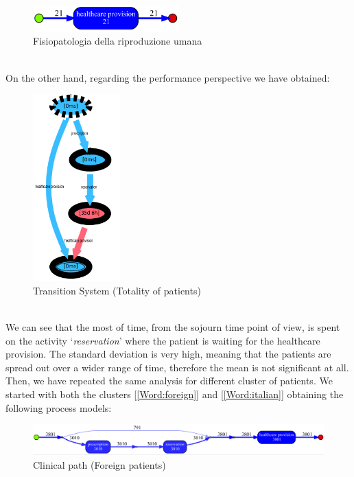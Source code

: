 \begin{figure} [htbp]
\includegraphics[width = 0.5\textwidth, keepaspectratio]{AmbulatoriInductiveVisualMiner5701}
\caption{Fisiopatologia della riproduzione umana}
\end{figure}\\
On the other hand, regarding the performance perspective we have obtained:
\begin{figure} [htbp]
\includegraphics[width=0.3\textwidth, keepaspectratio]{AmbulatoriTransitionSystemSojourn}
\caption{Transition System (Totality of patients)}
\end{figure}\\
We can see that the most of time, %
from the sojourn time point of view, is spent on the activity `\textit{reservation}' where the patient is waiting for the healthcare provision. The standard deviation is very high, meaning that the patients are spread out over a wider range of time, therefore the mean is not significant at all. Then, we have repeated the same analysis for different cluster of patients. We started with both the clusters [\ref{Word:foreign}] and [\ref{Word:italian}] obtaining the following process models:
\begin{figure} [htbp]
\centering
\includegraphics[width=\textwidth , keepaspectratio]{AmbulatoriInductiveVisualMinerForeigns}
\caption{Clinical path (Foreign patients)}
\end{figure}\\
